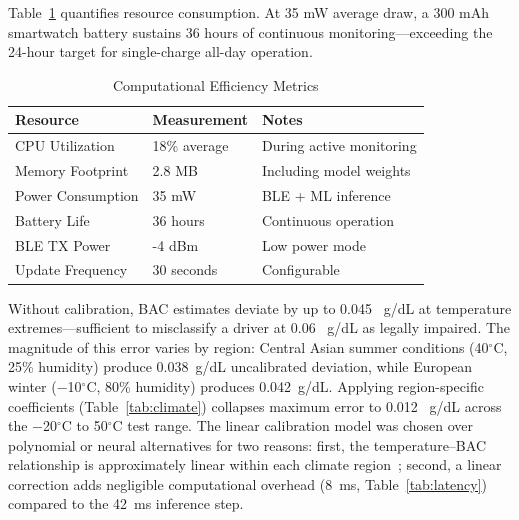\documentclass[HARVARD,Times2COL]{WileyNJDv5} %
\providecommand{\DIFadd}[1]{{\protect\color{red} #1}} %
\providecommand{\DIFdel}[1]{} %
\providecommand{\DIFaddbegin}{} %
\providecommand{\DIFaddend}{} %
\providecommand{\DIFdelbegin}{} %
\providecommand{\DIFdelend}{} %
\providecommand{\DIFscaledelfig}{0.5}
\newlength{\DIFdelgraphicswidth} %
\newlength{\DIFdelgraphicsheight} %
\providecommand{\DIFaddincludegraphics}[2][]{{\color{blue}\fbox{\DIFOincludegraphics[#1]{#2}}}} %
\providecommand{\DIFdelincludegraphics}[2][]{%
\sbox{\DIFdelgraphicsbox}{\DIFOincludegraphics[#1]{#2}}%
\settoboxwidth{\DIFdelgraphicswidth}{\DIFdelgraphicsbox} %
\settoboxtotalheight{\DIFdelgraphicsheight}{\DIFdelgraphicsbox} %
\scalebox{\DIFscaledelfig}{%
\parbox[b]{\DIFdelgraphicswidth}{\usebox{\DIFdelgraphicsbox}\\[-\baselineskip] \rule{\DIFdelgraphicswidth}{0em}}\llap{\resizebox{\DIFdelgraphicswidth}{\DIFdelgraphicsheight}{%
\setlength{\unitlength}{\DIFdelgraphicswidth}%
\begin{picture}(1,1)%
\thicklines\linethickness{2pt} %
{\color[rgb]{1,0,0}\put(0,0){\framebox(1,1){}}}%
{\color[rgb]{1,0,0}\put(0,0){\line( 1,1){1}}}%
{\color[rgb]{1,0,0}\put(0,1){\line(1,-1){1}}}%
\end{picture}%
}\hspace*{3pt}}} %
} %
\DeclareRobustCommand{\DIFaddbegin}{\DIFOaddbegin \let\includegraphics\DIFaddincludegraphics} %
\DeclareRobustCommand{\DIFaddend}{\DIFOaddend \let\includegraphics\DIFOincludegraphics} %
\DeclareRobustCommand{\DIFdelbegin}{\DIFOdelbegin \let\includegraphics\DIFdelincludegraphics} %
\DeclareRobustCommand{\DIFdelend}{\DIFOaddend \let\includegraphics\DIFOincludegraphics} %
\begin{document}
Table~\ref{tab:efficiency} quantifies resource consumption. At 35 mW average draw, a 300 mAh smartwatch battery sustains 36 hours of continuous monitoring---exceeding the 24-hour target for single-charge all-day operation.

\begin{table}[htbp]
\caption{Computational Efficiency Metrics}
\label{tab:efficiency}
\centering
\small
\begin{tabular}{@{}lll@{}}
\toprule
\textbf{Resource} & \textbf{Measurement} & \textbf{Notes} \\
\midrule
CPU Utilization & 18\% average & During active monitoring \\
Memory Footprint & 2.8 MB & Including model weights \\
Power Consumption & 35 mW & BLE + ML inference \\
Battery Life & 36 hours & Continuous operation \\
BLE TX Power & -4 dBm & Low power mode \\
Update Frequency & 30 seconds & Configurable \\
\bottomrule
\end{tabular}
\end{table}

Without calibration, BAC estimates deviate by up to 0.045\DIFaddbegin \DIFadd{~}\DIFaddend g/dL at temperature extremes---sufficient to misclassify a driver at 0.06\DIFaddbegin \DIFadd{~}\DIFaddend g/dL as legally impaired. \DIFaddbegin \DIFadd{The magnitude of this error varies by region: Central Asian summer conditions (40$^\circ$C, 25\% humidity) produce 0.038~g/dL uncalibrated deviation, while European winter ($-$10$^\circ$C, 80\% humidity) produces 0.042~g/dL. }\DIFaddend Applying region-specific coefficients (Table~\ref{tab:climate}) collapses maximum error to 0.012\DIFaddbegin \DIFadd{~}\DIFaddend g/dL across the \DIFdelbegin \DIFdel{-20}\DIFdelend \DIFaddbegin \DIFadd{$-$20}\DIFaddend $^\circ$C to 50$^\circ$C test range. \DIFdelbegin %
\DIFdelend \DIFaddbegin \DIFadd{The linear calibration model was chosen over polynomial or neural alternatives for two reasons: first, the temperature--BAC relationship is approximately linear within each climate region~\citep{fairbairn2021}; second, a linear correction adds negligible computational overhead (8~ms, Table~\ref{tab:latency}) compared to the 42~ms inference step.
}
\end{document}
